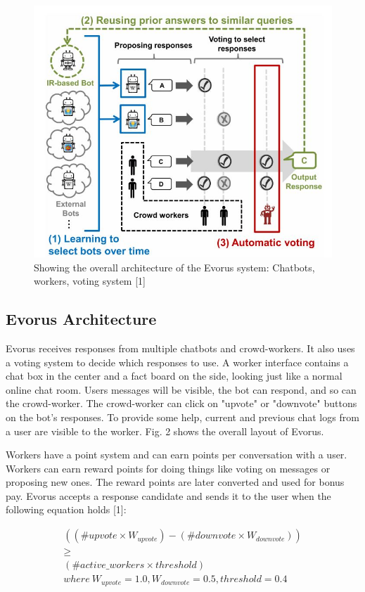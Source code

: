 \documentclass[letterpaper, 10 pt, conference]{IEEEtran}
\begin{document}
\begin{figure}[!ht]
\renewcommand\figurename{Fig.}
\centering
\includegraphics[width=\columnwidth]{EvorusSystem.png}
\caption{Showing the overall architecture of the Evorus system: Chatbots, workers, voting system [1]}
\end{figure} 

\subsection{Evorus Architecture}
Evorus receives responses from multiple chatbots and crowd-workers. It also uses a voting system to decide which responses to use. A worker interface contains a chat box in the center and a fact board on the side, looking just like a normal online chat room. Users messages will be visible, the bot can respond, and so can the crowd-worker. The crowd-worker can click on "upvote" or "downvote" buttons on the bot's responses. To provide some help, current and previous chat logs from a user are visible to the worker. Fig. 2 shows the overall layout of Evorus. 
\par Workers have a point system and can earn points per conversation with a user. Workers can earn reward points for doing things like voting on messages or proposing new ones. The reward points are later converted and used for bonus pay. Evorus accepts a response candidate and sends it to the user when the following equation holds [1]:

\begin{equation}
\begin{gathered}
((\#upvote \times W_{upvote}) - (\#downvote \times W_{downvote})) \\
\geq \\ 
(\#active\_workers \times threshold) \\
where \ W_{upvote} = 1.0, W_{downvote} = 0.5, threshold = 0.4
\end{gathered}
\end{equation} 
\end{document}
